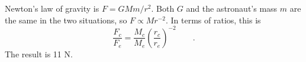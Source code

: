 Newton's law of gravity is $F=GMm/r^2$. Both $G$ and the astronaut's
mass $m$ are the same in the two situations, so
$F\propto Mr^{-2}$. In terms of ratios, this is
\begin{equation*}
  \frac{F_c}{F_e} = \frac{M_c}{M_e}\left(\frac{r_c}{r_e}\right)^{-2} \qquad .
\end{equation*}
The result is 11 N.
